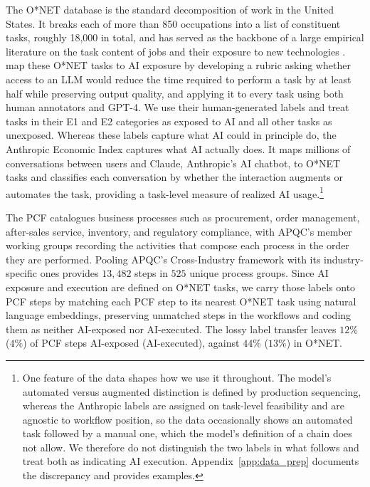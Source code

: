 The O*NET database is the standard decomposition of work in the United States.
It breaks each of more than 850 occupations into a list of constituent tasks, roughly 18,000 in total, and has served as the backbone of a large empirical literature on the task content of jobs and their exposure to new technologies \citep[e.g.,][]{autor2013putting, deming2017growing, brynjolfsson2018can, webb2020impact, felten2021occupational}.
\cite{eloundou2023gpts} map these O*NET tasks to AI exposure by developing a rubric asking whether access to an LLM would reduce the time required to perform a task by at least half while preserving output quality, and applying it to every task using both human annotators and GPT-4.
We use their human-generated labels and treat tasks in their E1 and E2 categories as exposed to AI and all other tasks as unexposed.
Whereas these labels capture what AI could in principle do, the Anthropic Economic Index \citep{handa2025economictasksperformedai} captures what AI actually does.
It maps millions of conversations between users and Claude, Anthropic's AI chatbot, to O*NET tasks and classifies each conversation by whether the interaction augments or automates the task, providing a task-level measure of realized AI usage.\footnote{One feature of the data shapes how we use it throughout. The model's automated versus augmented distinction is defined by production sequencing, whereas the Anthropic labels are assigned on task-level feasibility and are agnostic to workflow position, so the data occasionally shows an automated task followed by a manual one, which the model's definition of a chain does not allow. We therefore do not distinguish the two labels in what follows and treat both as indicating AI execution. Appendix~\ref{app:data_prep} documents the discrepancy and provides examples.}

The PCF catalogues business processes such as procurement, order management, after-sales service, inventory, and regulatory compliance, with APQC's member working groups recording the activities that compose each process in the order they are performed.
Pooling APQC's Cross-Industry framework with its industry-specific ones provides $13{,}482$ steps in $525$ unique process groups.
Since AI exposure and execution are defined on O*NET tasks, we carry those labels onto PCF steps by matching each PCF step to its nearest O*NET task using natural language embeddings, preserving unmatched steps in the workflows and coding them as neither AI-exposed nor AI-executed.
The lossy label transfer leaves $12\%$ ($4\%$) of PCF steps AI-exposed (AI-executed), against $44\%$ ($13\%$) in O*NET.

